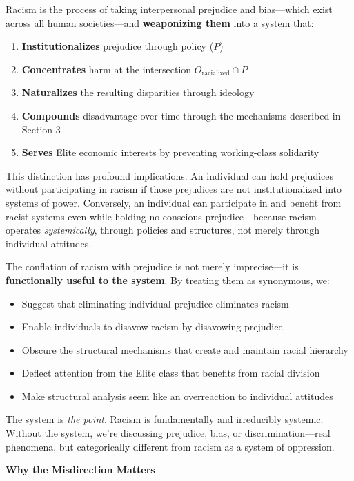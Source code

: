 \documentclass[12pt]{article}
\begin{document}
Racism is the process of taking interpersonal prejudice and bias---which exist across all human societies---and \textbf{weaponizing them} into a system that:
\begin{enumerate}
    \item \textbf{Institutionalizes} prejudice through policy ($P$)
    \item \textbf{Concentrates} harm at the intersection $O_{\text{racialized}} \cap P$
    \item \textbf{Naturalizes} the resulting disparities through ideology
    \item \textbf{Compounds} disadvantage over time through the mechanisms described in Section 3
    \item \textbf{Serves} Elite economic interests by preventing working-class solidarity
\end{enumerate}

This distinction has profound implications. An individual can hold prejudices without participating in racism if those prejudices are not institutionalized into systems of power. Conversely, an individual can participate in and benefit from racist systems even while holding no conscious prejudice---because racism operates \textit{systemically}, through policies and structures, not merely through individual attitudes.

The conflation of racism with prejudice is not merely imprecise---it is \textbf{functionally useful to the system}. By treating them as synonymous, we:
\begin{itemize}
    \item Suggest that eliminating individual prejudice eliminates racism
    \item Enable individuals to disavow racism by disavowing prejudice
    \item Obscure the structural mechanisms that create and maintain racial hierarchy
    \item Deflect attention from the Elite class that benefits from racial division
    \item Make structural analysis seem like an overreaction to individual attitudes
\end{itemize}

The system is \textit{the point}. Racism is fundamentally and irreducibly systemic. Without the system, we're discussing prejudice, bias, or discrimination---real phenomena, but categorically different from racism as a system of oppression.

\textbf{Why the Misdirection Matters}
\end{document}
